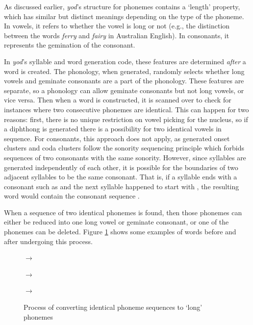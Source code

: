 \documentclass{report}
\begin{document}
	As discussed earlier, \textit{yod}'s structure for phonemes contains a `length' property, which has similar but distinct meanings depending on the type of the phoneme. In vowels, it refers to whether the vowel is long or not (e.g., the distinction between the words \textit{ferry}  and \textit{fairy}  in Australian English). In consonants, it represents the gemination of the consonant.
	
	In \textit{yod}'s syllable and word generation code, these features are determined \textit{after} a word is created. The phonology, when generated, randomly selects whether long vowels and geminate consonants are a part of the phonology. These features are separate, so a phonology can allow geminate consonants but not long vowels, or vice versa. Then when a word is constructed, it is scanned over to check for instances where two consecutive phonemes are identical. This can happen for two reasons: first, there is no unique restriction on vowel picking for the nucleus, so if a diphthong is generated there is a possibility for two identical vowels in sequence. For consonants, this approach does not apply, as generated onset clusters and coda clusters follow the sonority sequencing principle which forbids sequences of two consonants with the same sonority. However, since syllables are generated independently of each other, it is possible for the boundaries of two adjacent syllables to be the same consonant. That is, if a syllable ends with a consonant such as  and the next syllable happened to start with , the resulting word would contain the consonant sequence .
	
	When a sequence of two identical phonemes is found, then those phonemes can either be reduced into one long vowel or geminate consonant, or one of the phonemes can be deleted. Figure \ref{convert to long phonemes examples} shows some examples of words before and after undergoing this process.
	
	\begin{figure}[h]
		\caption{Process of converting identical phoneme sequences to `long' phonemes}
		\label{convert to long phonemes examples}
		\begin{tcolorbox}
			\begin{Large}
				 $\rightarrow$ 
				
				 $\rightarrow$ 
				
				 $\rightarrow$ 
			\end{Large}
		\end{tcolorbox}
	\end{figure}
\end{document}
